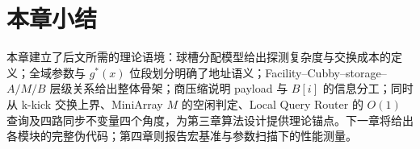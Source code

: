 \section{本章小结}

本章建立了后文所需的理论语境：球槽分配模型给出探测复杂度与交换成本的定义\cite{knuth1973sorting,aamand2021dynamic}；全域参数与 \(g^\ast(x)\) 位段划分明确了地址语义；Facility--Cubby--storage--\(A/M/B\) 层级关系给出整体骨架；商压缩说明 payload 与 \(B[i]\) 的信息分工\cite{bender2022otsh,lehmann2025combined}；同时从 k-kick 交换上界、MiniArray \(M\) 的空闲判定、Local Query Router 的 \(O(1)\) 查询及四路同步不变量四个角度，为第三章算法设计提供理论锚点。下一章将给出各模块的完整伪代码；第四章则报告宏基准与参数扫描下的性能测量。
